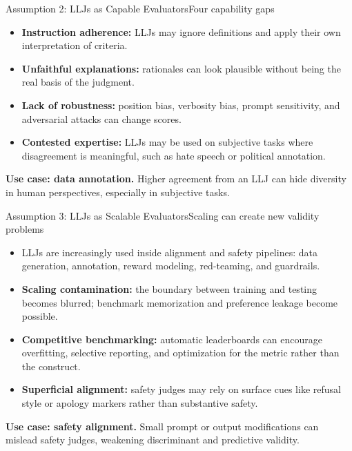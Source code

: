 \documentclass[10pt]{beamer}
\begin{document}
	\begin{frame}{Assumption 2: LLJs as Capable Evaluators}{Four capability gaps}
		\begin{itemize}
			\item \textbf{Instruction adherence:} LLJs may ignore definitions and apply their own interpretation of criteria.
			\item \textbf{Unfaithful explanations:} rationales can look plausible without being the real basis of the judgment.
			\item \textbf{Lack of robustness:} position bias, verbosity bias, prompt sensitivity, and adversarial attacks can change scores.
			\item \textbf{Contested expertise:} LLJs may be used on subjective tasks where disagreement is meaningful, such as hate speech or political annotation.
		\end{itemize}
		\vspace{0.25cm}
		\textbf{Use case: data annotation.} Higher agreement from an LLJ can hide diversity in human perspectives, especially in subjective tasks.
	\end{frame}
	
	\begin{frame}{Assumption 3: LLJs as Scalable Evaluators}{Scaling can create new validity problems}
		\begin{itemize}
			\item LLJs are increasingly used inside alignment and safety pipelines: data generation, annotation, reward modeling, red-teaming, and guardrails.
			\item \textbf{Scaling contamination:} the boundary between training and testing becomes blurred; benchmark memorization and preference leakage become possible.
			\item \textbf{Competitive benchmarking:} automatic leaderboards can encourage overfitting, selective reporting, and optimization for the metric rather than the construct.
			\item \textbf{Superficial alignment:} safety judges may rely on surface cues like refusal style or apology markers rather than substantive safety.
		\end{itemize}
		\vspace{0.2cm}
		\textbf{Use case: safety alignment.} Small prompt or output modifications can mislead safety judges, weakening discriminant and predictive validity.
	\end{frame}
	
\end{document}
